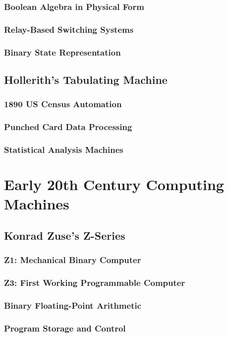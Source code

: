 \documentclass[12pt, oneside]{book}
\begin{document}
\subsubsection{Boolean Algebra in Physical Form}
\subsubsection{Relay-Based Switching Systems}
\subsubsection{Binary State Representation}

\subsection{Hollerith's Tabulating Machine}
\subsubsection{1890 US Census Automation}
\subsubsection{Punched Card Data Processing}
\subsubsection{Statistical Analysis Machines}

\section{Early 20th Century Computing Machines}
\subsection{Konrad Zuse's Z-Series}
\subsubsection{Z1: Mechanical Binary Computer}
\subsubsection{Z3: First Working Programmable Computer}
\subsubsection{Binary Floating-Point Arithmetic}
\subsubsection{Program Storage and Control}
\end{document}
